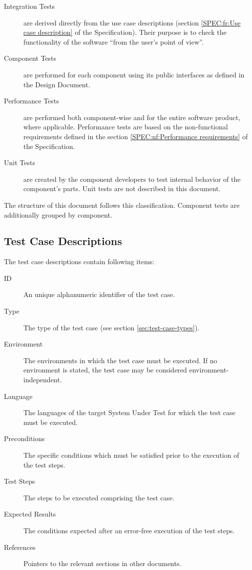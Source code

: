 \documentclass[a4paper,12pt,liststotoc,DIV12]{scrartcl}
\begin{document}
\begin{description}
\item[Integration Tests] are derived directly from the use case descriptions
  (section \ref{SPEC:fr:Use case description} of the Specification). Their
  purpose is to check the functionality of the software ``from the user's
  point of view''.
\item[Component Tests] are performed for each component using its public
  interfaces as defined in the Design Document.
\item[Performance Tests] are performed both component-wise and for the
  entire software product, where applicable. Performance tests are based on
  the non-functional requirements defined in the section
  \ref{SPEC:nf:Performance requirements} of the Specification.
\item[Unit Tests] are created by the component developers to test internal
  behavior of the component's parts. Unit tests are not described in this
  document. 
\end{description}

The structure of this document follows this classification. Component tests
are additionally grouped by component.

\subsection{Test Case Descriptions}
\label{sec:test-case-descr}

The test case descriptions contain following items:

\begin{description}
\item[ID] An unique alphanumeric identifier of the test case.
\item[Type] The type of the test case (see section \ref{sec:test-case-types}).
\item[Environment] The environments in which the test case must be executed.
  If no environment is stated, the test case may be considered
  environment-independent.
\item[Language] The languages of the target System Under Test for which the test case must be executed.
\item[Preconditions] The specific conditions which must be satisfied prior to the execution of the test steps.
\item[Test Steps] The steps to be executed comprising the test case.
\item[Expected Results] The conditions expected after an error-free execution of the test steps.
\item[References] Pointers to the relevant sections in other documents.
\end{description}
\end{document}
